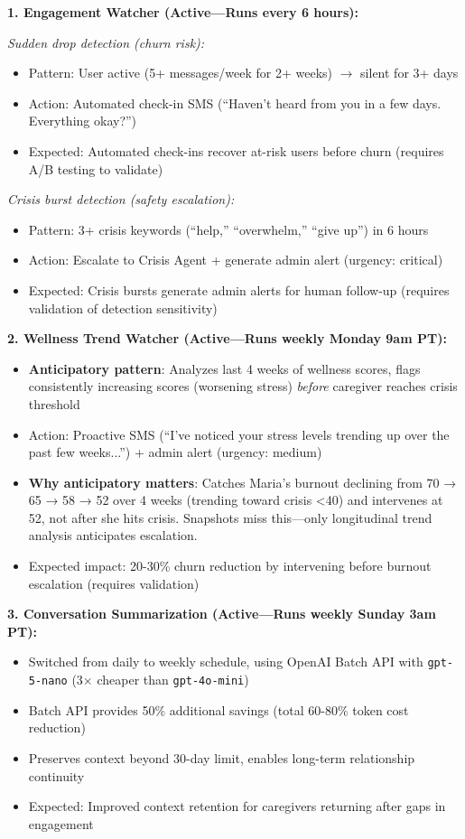\documentclass{article}
\begin{document}
\textbf{1. Engagement Watcher (Active—Runs every 6 hours):}

\textit{Sudden drop detection (churn risk):}
\begin{itemize}
    \item Pattern: User active (5+ messages/week for 2+ weeks) $\rightarrow$ silent for 3+ days
    \item Action: Automated check-in SMS (``Haven't heard from you in a few days. Everything okay?'')
    \item Expected: Automated check-ins recover at-risk users before churn (requires A/B testing to validate)
\end{itemize}

\textit{Crisis burst detection (safety escalation):}
\begin{itemize}
    \item Pattern: 3+ crisis keywords (``help,'' ``overwhelm,'' ``give up'') in 6 hours
    \item Action: Escalate to Crisis Agent + generate admin alert (urgency: critical)
    \item Expected: Crisis bursts generate admin alerts for human follow-up (requires validation of detection sensitivity)
\end{itemize}

\textbf{2. Wellness Trend Watcher (Active—Runs weekly Monday 9am PT):}
\begin{itemize}
    \item \textbf{Anticipatory pattern}: Analyzes last 4 weeks of wellness scores, flags consistently increasing scores (worsening stress) \textit{before} caregiver reaches crisis threshold
    \item Action: Proactive SMS (``I've noticed your stress levels trending up over the past few weeks...'') + admin alert (urgency: medium)
    \item \textbf{Why anticipatory matters}: Catches Maria's burnout declining from 70 → 65 → 58 → 52 over 4 weeks (trending toward crisis <40) and intervenes at 52, not after she hits crisis. Snapshots miss this—only longitudinal trend analysis anticipates escalation.
    \item Expected impact: 20-30\% churn reduction by intervening before burnout escalation (requires validation)
\end{itemize}

\textbf{3. Conversation Summarization (Active—Runs weekly Sunday 3am PT):}
\begin{itemize}
    \item Switched from daily to weekly schedule, using OpenAI Batch API with \texttt{gpt-5-nano} (3$\times$ cheaper than \texttt{gpt-4o-mini})
    \item Batch API provides 50\% additional savings (total 60-80\% token cost reduction)
    \item Preserves context beyond 30-day limit, enables long-term relationship continuity
    \item Expected: Improved context retention for caregivers returning after gaps in engagement
\end{itemize}
\end{document}

